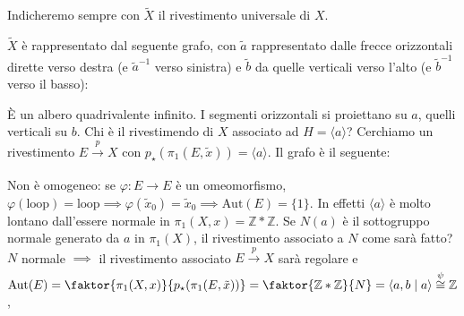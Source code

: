 \begin{ex}
  Indicheremo sempre con $\widetilde{X}$ il rivestimento universale di $X$.

  $\widetilde{X}$ è rappresentato dal seguente grafo, con $\tilde{a}$ rappresentato dalle frecce orizzontali dirette verso destra (e $\tilde{a}^{-1}$ verso sinistra) e $\tilde{b}$ da quelle verticali verso l'alto (e $\tilde{b}^{-1}$ verso il basso):
  \begin{center}
  \end{center}
  È un albero quadrivalente infinito. I segmenti orizzontali si proiettano su $a$, quelli verticali su $b$. Chi è il rivestimendo di $X$ associato ad $H=\langle a \rangle$? Cerchiamo un rivestimento $E \xrightarrow[]{p} X$ con $p_{\star}(\pi_1(E, \tilde{x}))=\langle a \rangle$. Il grafo è il seguente:
  \begin{center}
  \end{center}
  Non è omogeneo: se $\varphi:E \longrightarrow E$ è un omeomorfismo, $\varphi(\text{loop})=\text{loop} \implies \varphi(\tilde{x}_0)=\tilde{x}_0 \implies \text{Aut}(E)=\{1\}$. In effetti $\langle a \rangle$ è molto lontano dall'essere normale in $\pi_1(X, x)=\mathbb{Z} * \mathbb{Z}$.
  Se $N(a)$ è il sottogruppo normale generato da $a$ in $\pi_1(X)$, il rivestimento associato a $N$ come sarà fatto?
  $N$ normale $\implies$ il rivestimento associato $E \xrightarrow[]{p} X$ sarà regolare e $\text{Aut}(E)=\faktor{\pi_1(X, x)}{p_{\star}(\pi_1(E, \tilde{x}))}=\faktor{\mathbb{Z} * \mathbb{Z}}{N}=\langle a, b \mid a \rangle \overset{\psi}{\cong} \mathbb{Z}$,
  \begin{align*}

\end{align*}
\end{ex}
